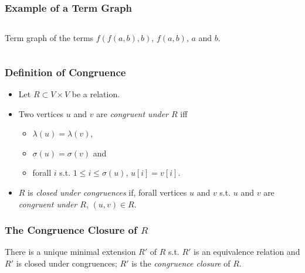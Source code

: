 \documentclass{beamer}
\begin{document}
\begin{frame}
  \frametitle{Example of a Term Graph}

  \begin{columns}
    \begin{column}{0.5\textwidth}
      Term graph of the terms $f(f(a,b),b)$, $f(a,b)$, $a$ and $b$.
    \end{column}
    \begin{column}{0.5\textwidth}
    \end{column}
  \end{columns}
\end{frame}

\begin{frame}
  \frametitle{Definition of Congruence}

  \begin{Definition}[Congruence]
    \begin{itemize}
      \item Let $R \subset V \times V$ be a relation.
      \item Two vertices $u$ and $v$ are \textit{congruent under $R$} iff
        \begin{itemize}
          \item $\lambda(u) = \lambda(v)$,
          \item $\sigma(u) = \sigma(v)$ and
          \item forall $i$ s.t. $1 \leq i \leq \sigma(u)$, $u[i] = v[i]$.
        \end{itemize}
      \item $R$ is \textit{closed under congruences} if, forall vertices $u$ and
        $v$ s.t. $u$ and $v$ are \textit{congruent under $R$}, $(u,v) \in R$.
    \end{itemize}
  \end{Definition}

\end{frame}


\begin{frame}
  \frametitle{The Congruence Closure of $R$}

  \begin{Lemma}
    There is a unique minimal extension $R'$ of $R$ s.t. $R'$ is an equivalence
    relation and $R'$ is closed under congruences; $R'$ is the
    \textit{congruence closure} of $R$.
  \end{Lemma}
\end{frame}
\end{document}
